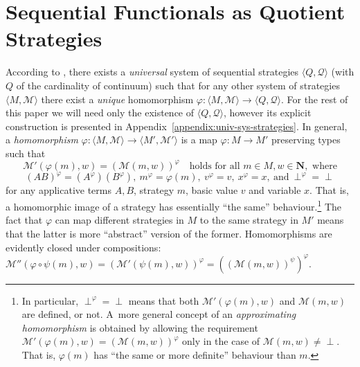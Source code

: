 \documentclass[fleqn]{LMCS}
\theoremstyle{plain}\newtheorem{satz}[thm]{Satz}
\theoremstyle{plain}\newtheorem{hyp}[thm]{Hypothesis}
\theoremstyle{plain}\newtheorem{hyps}[thm]{Hypotheses}
\theoremstyle{definition}\newtheorem{note}[thm]{Note}
\newcommand{\arr}{\rightarrow}
\newcommand{\la}{\langle}
\newcommand{\ra}{\rangle}
\newcommand{\tuple}[1]{\la #1 \ra}
\newcommand{\NN}{\mathbf{N}}
\newcommand{\Undef}{{\perp}}
\newcommand{\MM}{{\mathcal M}}
\newcommand{\QQ}{{\mathcal Q}}
\newcommand{\?}{\mbox{?}}
\begin{document}
\section{Sequential Functionals as Quotient Strategies}
\label{sec-quotient}

\noindent
According to \cite{Saz76SMZH,Saz76t}, 
there exists a {\em universal\/} system of
sequential strategies $\tuple{Q,\QQ}$ 
(with $Q$ of the cardinality of continuum)
such that for any other system
of strategies $\tuple{M,\MM}$ there exist a \emph{unique} homomorphism
$\varphi:\tuple{M,\MM}\arr\tuple{Q,\QQ}$. 
For the rest of this paper we will need only the existence of $\tuple{Q,\QQ}$, 
however its explicit construction is presented 
in Appendix~\ref{appendix:univ-sys-strategies}. 
In general, 
a \emph{homomorphism} $\varphi:\tuple{M,\MM}\arr\tuple{M',\MM'}$
is a map $\varphi:M\arr M'$ preserving types such that 
\[
\MM'(\varphi(m),w) = (\MM(m,w))^{\varphi}\quad\mbox{holds for all }
m\in M, w\in\NN,
\mbox{ where}
\]
\[(AB)^{\varphi} = (A^{\varphi})(B^{\varphi}),
\ m^{\varphi} = \varphi(m),
\ v^{\varphi}=v,
\ x^{\varphi}=x, 
\ \mbox{and}
\ \Undef^{\varphi}=\Undef\]
for any applicative terms $A,B$, strategy $m$, basic value $v$ and 
variable $x$. 
That is, a homomorphic image of a strategy has essentially ``the same'' behaviour.\footnote{\label{foot:approx-hom} 
In particular, $\Undef^\varphi=\Undef$ means that both 
$\MM'(\varphi(m),w)$ and $\MM(m,w)$ are defined, or not. 
A~more general concept of an \emph{approximating homomorphism} 
is obtained by allowing the requirement 
$\MM'(\varphi(m),w) = (\MM(m,w))^{\varphi}$ 
only in the case of $\MM(m,w)\ne\Undef$. 
That is, $\varphi(m)$ has ``the same or more definite'' behaviour than $m$.  
}
The fact that $\varphi$ can map different strategies in $M$ to the same strategy 
in $M'$ means that the latter is more ``abstract'' version of the former. 
Homomorphisms are evidently closed under compositions: 
$\MM''(\varphi\circ\psi(m),w) 
= (\MM'(\psi(m),w))^{\varphi} 
= ((\MM(m,w))^{\psi})^{\varphi}$.
\end{document}
